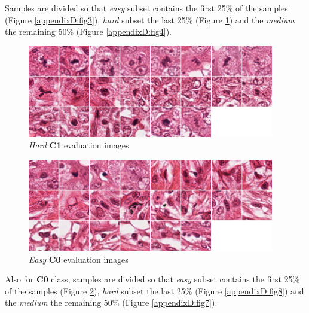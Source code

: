 Samples are divided so that \textit{easy} subset contains the first 25\% of the samples (Figure \ref{appendixD:fig3}), \textit{hard} subset the last 25\%
(Figure \ref{appendixD:fig5}) and the \textit{medium} the remaining 50\% (Figure \ref{appendixD:fig4}).

\begin{figure}[!hb]
 \centering
  \includegraphics[width=0.96\textwidth]{./images/dataset/C1_hard.png}
  \caption{\textit{Hard} \textbf{C1} evaluation images}
  \label{appendixD:fig5}
\end{figure}

\clearpage

\begin{figure}[!ht]
 \centering
  \includegraphics[width=0.96\textwidth]{./images/dataset/C0_easy.png}
  \caption{\textit{Easy} \textbf{C0} evaluation images}
  \label{appendixD:fig6}
\end{figure}

Also for \textbf{C0} class, samples are divided so that \textit{easy} subset contains the first 25\% of the samples (Figure \ref{appendixD:fig6}), \textit{hard} subset the last 25\%
(Figure \ref{appendixD:fig8}) and the \textit{medium} the remaining 50\% (Figure \ref{appendixD:fig7}).


